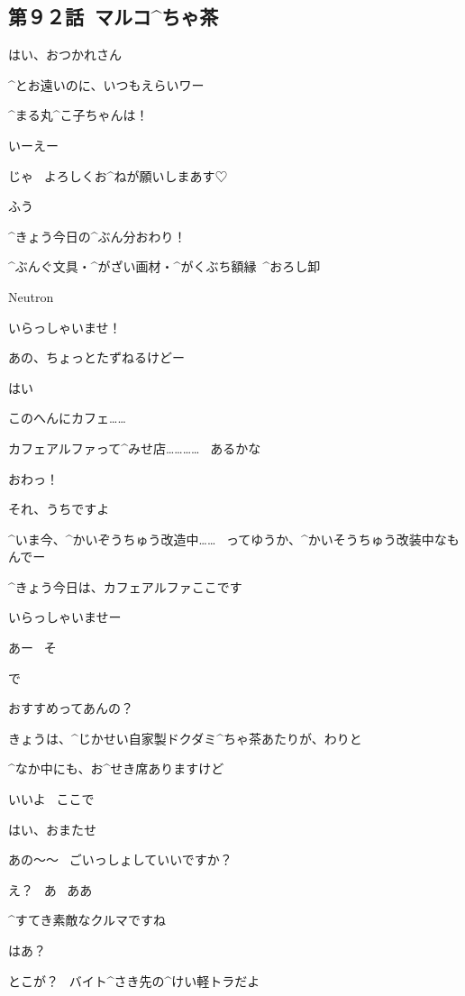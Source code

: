 \subsection{第９２話\ マルコ^{ちゃ}{茶}}

\page[56]
\Person はい、おつかれさん

\Person ^{とお}{遠}いのに、いつもえらいワー

\Person ^{まる}{丸}^{こ}{子}ちゃんは！

\Maruko いーえー

\Maruko じゃ
\ よろしくお^{ねが}{願}いしまあす♡

\Maruko ふう

\Maruko ^{きょう}{今日}の^{ぶん}{分}おわり！

\Sign ^{ぶんぐ}{文具}・^{がざい}{画材}・^{がくぶち}{額縁}\ ^{おろし}{卸}

\Sign Neutron

\page[59]
\Alpha いらっしゃいませ！

\page
\Maruko あの、ちょっとたずねるけどー

\Alpha はい

\Maruko このへんにカフェ……

\Maruko カフェアルファって^{みせ}{店}…………
\ あるかな

\Alpha おわっ！

\page
\Alpha それ、うちですよ

\Alpha ^{いま}{今}、^{かいぞうちゅう}{改造中}……
\ ってゆうか、^{かいそうちゅう}{改装中}なもんでー

\Alpha ^{きょう}{今日}は、カフェアルファここです

\Alpha いらっしゃいませー

\Maruko あー
\ そ

\page
\Maruko で

\Maruko おすすめってあんの？

\Alpha きょうは、^{じかせい}{自家製}ドクダミ^{ちゃ}{茶}あたりが、わりと

\Alpha ^{なか}{中}にも、お^{せき}{席}ありますけど

\Maruko いいよ
\ ここで

\Alpha はい、おまたせ

\Alpha あの〜〜
\ ごいっしょしていいですか？

\Maruko え？
\ あ
\ ああ

\page
\Alpha ^{すてき}{素敵}なクルマですね

\Maruko はあ？

\Maruko とこが？
\ バイト^{さき}{先}の^{けい}{軽}トラだよ

